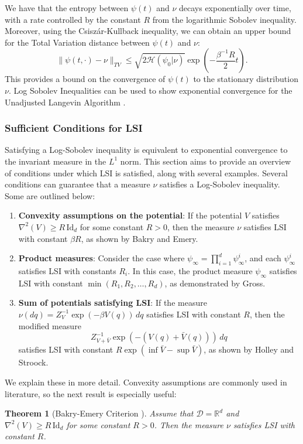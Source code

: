 \documentclass[11pt, twoside]{report}
\newtheorem{theorem}{Theorem}[section]
\begin{document}
We have that the entropy between $\psi(t)$ and $\nu$ decays exponentially over time, with a rate controlled by the constant $R$ from the logarithmic Sobolev inequality. Moreover, using the Csisz\'{a}r-Kullback inequality, we can obtain an upper bound for the Total Variation distance between $\psi(t)$ and $\nu$:
\[
\|\psi(t, \cdot) - \nu\|_{TV} \leq \sqrt{2\mathcal{H}(\psi_0 | \nu)} \exp\left(-\frac{\beta^{-1}R}{2} t\right).
\]
This provides a bound on the convergence of $\psi(t)$ to the stationary distribution $\nu$. Log Sobolev Inequalities can be used to show exponential convergence for the Unadjusted Langevin Algorithm \cite{Vempala2019}. 

\subsubsection{Sufficient Conditions for LSI}

Satisfying a Log-Sobolev inequality is equivalent to exponential convergence to the invariant measure in the $ L^1 $ norm. This section aims to provide an overview of conditions under which LSI is satisfied, along with several examples. Several conditions can guarantee that a measure $\nu$ satisfies a Log-Sobolev inequality. Some are outlined below:

\begin{enumerate}
    \item \textbf{Convexity assumptions on the potential}: 
    If the potential $ V $ satisfies $ \nabla^2(V) \geq R \, \mathrm{Id}_d $ for some constant $ R > 0 $, then the measure $ \nu $ satisfies LSI with constant $ \beta R $, as shown by Bakry and Emery\cite{bakryemery}.
    
    \item \textbf{Product measures}: 
    Consider the case where $ \psi_\infty = \prod_{i=1}^d \psi_\infty^i $, and each $ \psi_\infty^i $ satisfies LSI with constants $ R_i $. In this case, the product measure $ \psi_\infty $ satisfies LSI with constant $ \min(R_1, R_2, \dots, R_d) $, as demonstrated by Gross\cite{Gross1975}.
    
    \item \textbf{Sum of potentials satisfying LSI}: 
    If the measure $ \nu(dq) = Z_V^{-1} \exp{(-\beta V(q))} \, dq $ satisfies LSI with constant $ R $, then the modified measure
    \[
    Z_{V + \bar{V}}^{-1} \exp{(-(V(q) + \bar{V}(q)))} \, dq
    \]
    satisfies LSI with constant $ R \exp(\inf \bar{V} - \sup \bar{V}) $, as shown by Holley and Stroock\cite{Holley1987}.
\end{enumerate}
We explain these in more detail. Convexity assumptions are commonly used in literature, so the next result is especially useful: 
\begin{theorem}[Bakry-Emery Criterion \cite{bakryemery}]
    Assume that $\mathcal{D} = \mathbb{R}^d$ and $\nabla^2(V) \geq R \, \mathrm{Id}_d$ for some constant $R > 0$. Then the measure $\nu$ satisfies LSI with constant  $R$.
\end{theorem}
\end{document}

